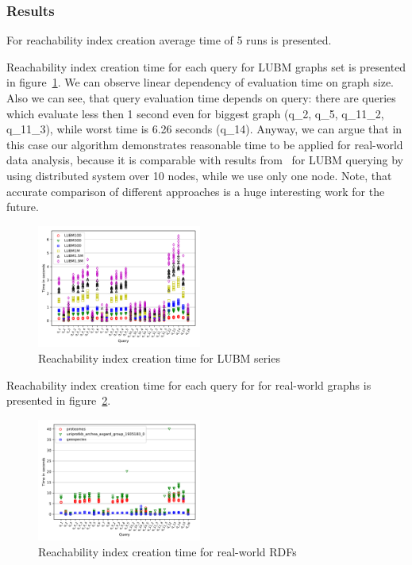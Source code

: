 \subsubsection{Results}

For reachability index creation average time of 5 runs is presented.

Reachability index creation time for each query for LUBM graphs set is presented in figure~\ref{fig:lubm_all_qs}.
We can observe linear dependency of evaluation time on graph size.
Also we can see, that query evaluation time depends on query: there are queries which evaluate less then 1 second even for biggest graph (q\_2, q\_5, q\_11\_2, q\_11\_3), while worst time is 6.26 seconds (q\_14).
Anyway, we can argue that in this case our algorithm demonstrates reasonable time to be applied for real-world data analysis, because it is comparable with results from~\cite{Wang2019} for LUBM querying by using distributed system over 10 nodes, while we use only one node. 
Note, that accurate comparison of different approaches is a huge interesting work for the future.

\begin{figure}
   \includegraphics[width=0.48\textwidth]{data/LUBM_all.pdf}
   \caption{Reachability index creation time for LUBM series}
   \label{fig:lubm_all_qs}
\end{figure}


Reachability index creation time for each query for for real-world graphs is presented in figure~\ref{fig:other_all_qs}.

\begin{figure}
   \includegraphics[width=0.48\textwidth]{data/other_all.pdf}
   \caption{Reachability index creation time for real-world RDFs}
   \label{fig:other_all_qs}
\end{figure}

